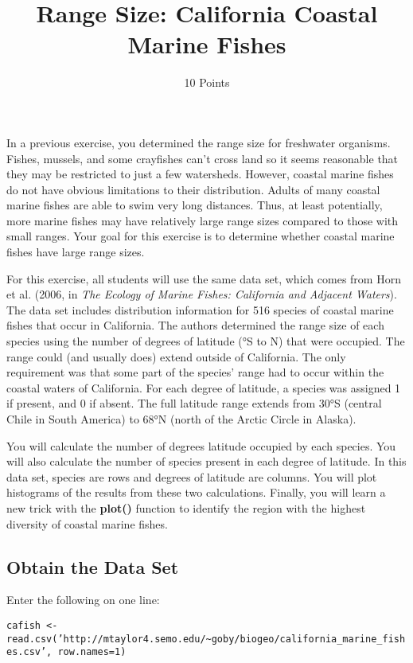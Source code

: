 \documentclass[11pt]{article}
\title{Range Size: California Coastal Marine Fishes}
\author{10 Points}
\date{}                                           %
\begin{document}
\maketitle
\thispagestyle{plain}

In a previous exercise, you determined the range size for freshwater
organisms. Fishes, mussels, and some crayfishes can't cross land so it seems
reasonable that they may be restricted to just a few watersheds.
However, coastal marine fishes do not have obvious limitations to their
distribution. Adults of many coastal marine fishes are able to swim very
long distances. Thus, at least potentially, more marine fishes may have
relatively large range sizes compared to those with small ranges. Your
goal for this exercise is to determine whether coastal marine fishes
have large range sizes.

For this exercise, all students will use the same data set, which comes
from Horn et al. (2006, in \emph{The Ecology of Marine Fishes:
California and Adjacent Waters}). The data set includes distribution
information for 516 species of coastal marine fishes that occur in
California. The authors determined the range size of each species using
the number of degrees of latitude (°S to N) that were occupied. The
range could (and usually does) extend outside of California. The only
requirement was that some part of the species' range had to occur within
the coastal waters of California. For each degree of latitude, a species
was assigned 1 if present, and 0 if absent. The full latitude range
extends from 30°S (central Chile in South America) to 68°N (north of the
Arctic Circle in Alaska).

You will calculate the number of degrees latitude occupied by each
species. You will also calculate the number of species present in each
degree of latitude. In this data set, species are rows and degrees of
latitude are columns. You will plot histograms of the results from these
two calculations. Finally, you will learn a new trick with the
\textbf{plot()} function to identify the region with the highest
diversity of coastal marine fishes.

\subsection*{Obtain the Data Set}

Enter the following on one line:

\texttt{cafish \textless{}-
read.csv('http://mtaylor4.semo.edu/\textasciitilde{}goby/biogeo/california\_marine\_fishes.csv', row.names=1)}
\end{document}

